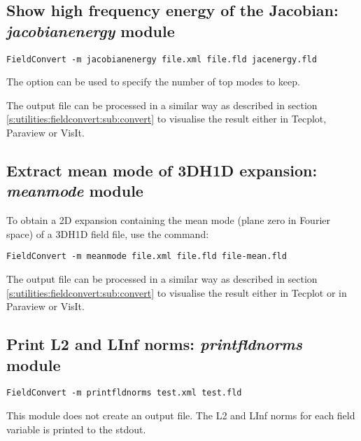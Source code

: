 \subsection{Show high frequency energy of the Jacobian: \textit{jacobianenergy} module}

\begin{lstlisting}[style=BashInputStyle] 
FieldConvert -m jacobianenergy file.xml file.fld jacenergy.fld
\end{lstlisting}

The option  can be used to specify the number of top modes to
keep.

The output file  can be processed in a similar 
way as described in section \ref{s:utilities:fieldconvert:sub:convert}
to visualise the result either in Tecplot, Paraview or VisIt. 

%
%
%

\subsection{Extract mean mode of 3DH1D expansion: \textit{meanmode} module}

To obtain a 2D expansion containing the mean mode (plane zero in Fourier space) of a
3DH1D field file, use the command:
\begin{lstlisting}[style=BashInputStyle] 
FieldConvert -m meanmode file.xml file.fld file-mean.fld
\end{lstlisting}

The output file  can be processed in a similar 
way as described in section \ref{s:utilities:fieldconvert:sub:convert}
to visualise the result either in Tecplot or in Paraview or VisIt.

%
%
%

\subsection{Print L2 and LInf norms: \textit{printfldnorms} module}

\begin{lstlisting}[style=BashInputStyle] 
FieldConvert -m printfldnorms test.xml test.fld 
\end{lstlisting}

This module does not create an output file. The L2 and LInf norms for
each field variable is printed to the stdout.

%
%
%


